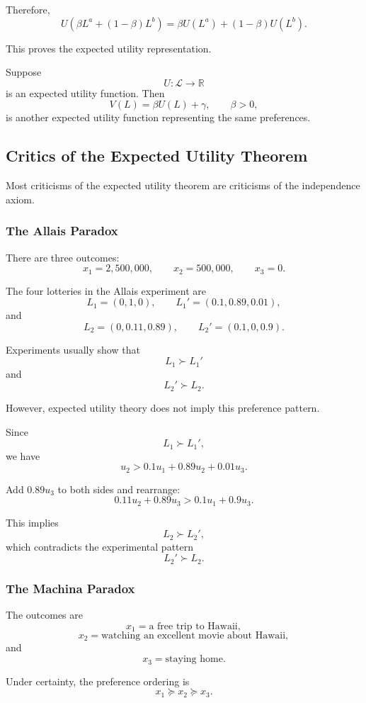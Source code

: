 Therefore,
\[
U(\beta L^a+(1-\beta)L^b)
=
\beta U(L^a)+(1-\beta)U(L^b).
\]

This proves the expected utility representation.

\medskip

Suppose
\[
U:\mathcal{L}\to\mathbb{R}
\]
is an expected utility function. Then
\[
V(L)=\beta U(L)+\gamma,
\qquad
\beta>0,
\]
is another expected utility function representing the same preferences.

\subsection{Critics of the Expected Utility Theorem}

Most criticisms of the expected utility theorem are criticisms of the independence axiom.

\subsubsection{The Allais Paradox}

There are three outcomes:
\[
x_1=2{,}500{,}000,
\qquad
x_2=500{,}000,
\qquad
x_3=0.
\]

The four lotteries in the Allais experiment are
\[
L_1=(0,1,0),
\qquad
L_1'=(0.1,0.89,0.01),
\]
and
\[
L_2=(0,0.11,0.89),
\qquad
L_2'=(0.1,0,0.9).
\]

Experiments usually show that
\[
L_1\succ L_1'
\]
and
\[
L_2'\succ L_2.
\]

However, expected utility theory does not imply this preference pattern.

Since
\[
L_1\succ L_1',
\]
we have
\[
u_2
>
0.1u_1+0.89u_2+0.01u_3.
\]

Add \(0.89u_3\) to both sides and rearrange:
\[
0.11u_2+0.89u_3
>
0.1u_1+0.9u_3.
\]

This implies
\[
L_2\succ L_2',
\]
which contradicts the experimental pattern
\[
L_2'\succ L_2.
\]



\subsubsection{The Machina Paradox}

The outcomes are
\[
x_1=\text{a free trip to Hawaii},
\]
\[
x_2=\text{watching an excellent movie about Hawaii},
\]
and
\[
x_3=\text{staying home}.
\]

Under certainty, the preference ordering is
\[
x_1\succeq x_2\succeq x_3.
\]

